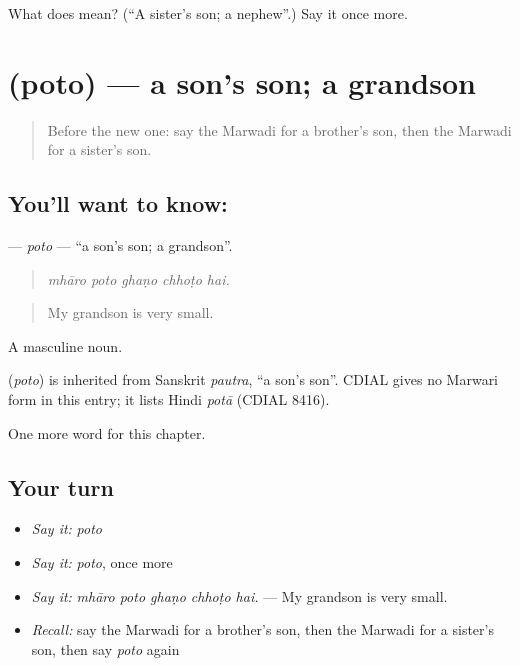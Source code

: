 \begin{tcolorbox}[breakable,colback=teal!4,colframe=teal!35!black,title={Before you move on}]
What does  mean? (\textquotedblleft{}A sister's son; a nephew\textquotedblright{}.) Say it once more.
\end{tcolorbox}
\section[\texorpdfstring{\mw{पोतो} (poto)}{पोतो (poto)}]{ (poto) — a son's son; a grandson}

\label{lesson:MW-C261-poto}



\begin{quote}
Before the new one: say the Marwadi for a brother's son, then the Marwadi for a sister's son.
\end{quote}

\subsection*{You'll want to know: }
\textbf{} — \emph{poto} — \textquotedblleft{}a son's son; a grandson\textquotedblright{}.

\begin{quote}
    
\end{quote}

\begin{quote}
\emph{mhāro poto ghaṇo chhoṭo hai.}
\end{quote}

\begin{quote}
My grandson is very small.
\end{quote}

A masculine noun.

\begin{cousinweb}
\textbf{} (\emph{poto}) is inherited from Sanskrit \emph{pautra}, \textquotedblleft{}a son's son\textquotedblright{}. CDIAL gives no Marwari form in this entry; it lists Hindi \emph{potā} (CDIAL 8416).
\end{cousinweb}

\begin{grammarlens}[title={What you've built}]
One more word for this chapter.
\end{grammarlens}

\subsection*{Your turn}
\begin{itemize}
\raggedright
  \item \emph{Say it:} \emph{poto}
  \item \emph{Say it:} \emph{poto}, once more
  \item \emph{Say it:} \emph{mhāro poto ghaṇo chhoṭo hai.} — My grandson is very small.
  \item \emph{Recall:} say the Marwadi for a brother's son, then the Marwadi for a sister's son, then say \emph{poto} again
\end{itemize}

